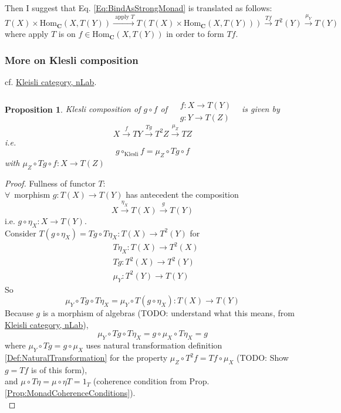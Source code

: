 \documentclass[10pt]{amsart}
\newtheorem{proposition}{Proposition}
\begin{document}
\begin{multicols*}{2}
Then I suggest that Eq. \ref{Eq:BindAsStrongMonad} is translated as follows:
\begin{equation}
T(X) \times \text{Hom}_{\mathbf{C}}(X, T(Y)) \xrightarrow{ \text{ apply } T } T( T(X) \times \text{Hom}_{\mathbf{C}}(X, T(Y))) \xrightarrow{ Tf} T^2(Y) \xrightarrow{ \mu_Y } T(Y) 
\end{equation}
where apply $T$ is on $f\in \text{Hom}_{\mathbf{C}}(X,T(Y))$ in order to form $Tf$.

\subsubsection{More on Klesli composition}

cf. \href{https://ncatlab.org/nlab/show/Kleisli+category}{Kleisli category, nLab}.

\begin{proposition}\label{Prop:KlesliCompositionForm}
	Klesli composition of $g\circ f$ of $\begin{aligned} & \quad \\ 
	& f: X\to T(Y) \\ 
	& g: Y \to T(Z) \end{aligned}$ \, is given by 
	\[
	X \xrightarrow{f} TY \xrightarrow{ Tg} T^2Z \xrightarrow{\mu_Z} TZ 
	\]
	i.e. 
	\begin{equation}
		\boxed{ g \circ_{\text{Klesli}} f = \mu_Z \circ Tg \circ f }
	\end{equation}
	with $ \mu_Z \circ Tg \circ f : X \to T(Z)$
\end{proposition}

\begin{proof}
	Fullness of functor $T$: \\
	
	$\forall \, $ morphism $g: T(X) \to T(Y)$ has antecedent the composition
	\[
	X\xrightarrow{ \eta_X} T(X) \xrightarrow{g} T(Y) 
	\]
	i.e. $g\circ \eta_X : X \to T(Y)$. \\
	
Consider $T(g \circ \eta_X) = Tg \circ T \eta_X : T(X) \to T^2(Y)$ for 
\[
\begin{aligned} 
	& T\eta_X : T(X) \to T^2(X) \\ 
	& Tg : T^2(X) \to T^2(Y) \\ 
	& \mu_Y : T^2(Y) \to T(Y) 
\end{aligned} 
\]
So 
\[
\mu_Y \circ Tg \circ T\eta_X = \mu_Y \circ T(g\circ \eta_X) : T(X) \to T(Y)
\]
Because $g$ is a morphism of algebras (TODO: understand what this means, from \href{https://ncatlab.org/nlab/show/Kleisli+category}{Kleisli category, nLab}), 
\[
\mu_Y \circ Tg \circ T\eta_X = g\circ \mu_X \circ T\eta_X = g
\]
where $\mu_Y \circ Tg = g\circ \mu_X$ uses natural transformation definition \ref{Def:NaturalTransformation} for the property $\mu_Z \circ T^2 f = Tf \circ \mu_X$ (TODO: Show $g=Tf$ is of this form), \\
and $\mu \circ T\eta = \mu \circ \eta T = 1_T$ (coherence condition from Prop. \ref{Prop:MonadCoherenceConditions}).  \\


\end{proof}
\end{multicols*}
\end{document}
